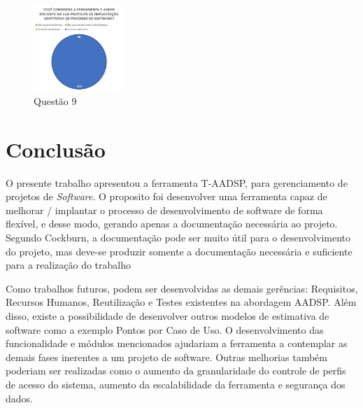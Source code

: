\documentclass{acm_proc_article-sp}
\begin{document}
\begin{figure}[!htb]
\centering %
\includegraphics[width=0.3\textwidth]{AV_9.jpg} %
\caption{Questão 9}
\end{figure}

\section{Conclusão}
O presente trabalho apresentou a ferramenta T-AADSP, para gerenciamento de projetos de \textit{Software}. O proposito foi desenvolver uma ferramenta capaz de melhorar / implantar o processo de desenvolvimento de software de forma flexível, e desse modo, gerando apenas a documentação necessária ao projeto.  Segundo Cockburn, a documentação pode ser muito útil para o desenvolvimento do projeto, mas deve-se produzir somente a documentação necessária e suficiente para a realização do trabalho \cite{agil:Cockburn}

Como trabalhos futuros, podem ser desenvolvidas as demais gerências: Requisitos, Recursos Humanos, Reutilização e Testes existentes na abordagem AADSP. Além disso, existe a possibilidade de desenvolver outros modelos de estimativa de software como a exemplo Pontos por Caso de Uso. O desenvolvimento das funcionalidade e módulos mencionados ajudariam a ferramenta a contemplar as demais fases inerentes a um projeto de software. Outras melhorias também poderiam ser realizadas como o aumento da granularidade do controle de perfis de acesso do sistema, aumento da escalabilidade da ferramenta e segurança dos dados.




\end{document}
